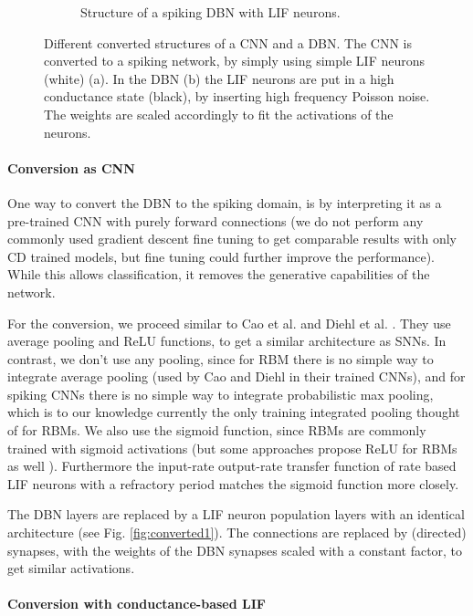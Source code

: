 \begin{figure}
\begin{subfigure}[t]{.5\textwidth}
  		\caption{Structure of a spiking DBN with LIF neurons.}
  		\label{fig:converted2}
  	\end{subfigure}
	\caption[Different converted structures of a CNN and a DBN.]{Different converted structures of a CNN and a DBN. The CNN is converted to a spiking network, by simply using simple LIF neurons (white) (a). In the DBN (b) the LIF neurons are put in a high conductance state (black), by inserting high frequency Poisson noise. The weights are scaled accordingly to fit the activations of the neurons.}
	\label{fig:converted}
\end{figure}


\paragraph{Conversion as CNN}  \label{c:convascnn}

One way to convert the DBN to the spiking domain, is by interpreting it as a pre-trained CNN with purely forward connections (we do not perform any commonly used gradient descent fine tuning to get comparable results with only CD trained models, but fine tuning could further improve the performance).
While this allows classification, it removes the generative capabilities of the network.

For the conversion, we proceed similar to Cao et al. and Diehl et al. \cite{Cao2014} \cite{Diehl2015} .
They use average pooling and ReLU functions, to get a similar architecture as SNNs.
In contrast, we don't use any pooling, since for RBM there is no simple way to integrate average pooling (used by Cao and Diehl in their trained CNNs), and for spiking CNNs there is no simple way to integrate probabilistic max pooling, which is to our knowledge currently the only training integrated pooling thought of for RBMs.
We also use the sigmoid function, since RBMs are commonly trained with sigmoid activations (but some approaches propose ReLU for RBMs as well \cite{Nair2010}).
Furthermore the input-rate output-rate transfer function of rate based LIF neurons with a refractory period matches the sigmoid function more closely.

The DBN layers are replaced by a LIF neuron population layers with an identical architecture (see Fig. \ref{fig:converted1}). 
The connections are replaced by (directed) synapses, with the weights of the DBN synapses scaled with a constant factor, to get similar activations.
 

\paragraph{Conversion with conductance-based LIF} \label{c:convascoba}

